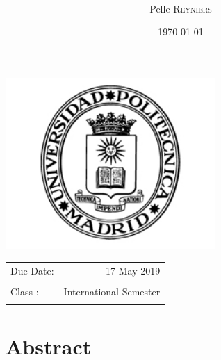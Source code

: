 \documentclass[twoside,a4paper]{article}
\title{\maintitle \\ \course \\{\small\ \coursenumber}} %
\author{Pelle \textsc{Reyniers} \\ } %
\date{\today} %
\newcommand{\class}{International Semester}
\begin{document}
    \sloppy %
    \begin{titlepage}
    \maketitle %
    
    \vfill
    \begin{center}
    \includegraphics[width=0.6\textwidth]{upm_logo.png} %
    \end{center}
    \vfill
    \vfill
    \vfill
    
    \begin{center}
    \begin{tabular}{l r}
    Due Date: & 17 May 2019 \\ %
    \\
    Class : & \class \\
    \\
    \end{tabular}
    \end{center}
    \vfill
    \vfill
    \end{titlepage}
    \clearpage
    
    
    
    \section*{Abstract}
    
    \newpage
\end{document}
